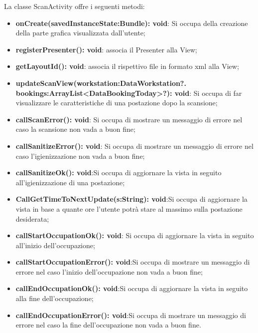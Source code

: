 La classe ScanActivity offre i seguenti metodi:
\begin{itemize}
	\item \textbf{onCreate(savedInstanceState:Bundle): void}: Si occupa della creazione della parte grafica visualizzata dall'utente; 
	\item \textbf{registerPresenter(): void}: associa il Presenter alla View; 
	\item \textbf{getLayoutId(): void}: associa il rispettivo file in formato xml alla View;
	\item \textbf{updateScanView(workstation:DataWorkstation?. bookings:ArrayList<DataBookingToday>?): void}: Si occupa di far visualizzare le caratteristiche di una postazione dopo la scansione; 
	\item \textbf{callScanError(): void}:  Si occupa di mostrare un messaggio di errore nel caso la scansione non vada a buon fine;
	\item \textbf{callSanitizeError(): void}: Si occupa di mostrare un messaggio di errore nel caso l'igienizzazione non vada a buon fine;
	\item \textbf{callSanitizeOk(): void}:Si occupa di aggiornare la vista in seguito all'igienizzazione di una postazione;
	\item \textbf{CallGetTimeToNextUpdate(s:String): void}:Si occupa di aggiornare la vista in base a quante ore l'utente potrà stare al massimo sulla postazione desiderata;
	\item \textbf{callStartOccupationOk(): void}: Si occupa di aggiornare la vista in seguito all'inizio dell'occupazione;
	\item \textbf{callStartOccupationError(): void}:Si occupa di mostrare un messaggio di errore nel caso l'inizio dell'occupazione non vada a buon fine;
	\item \textbf{callEndOccupationOk(): void}:Si occupa di aggiornare la vista in seguito alla fine dell'occupazione;
	\item \textbf{callEndOccupationError(): void}:Si occupa di mostrare un messaggio di errore nel caso la fine dell'occupazione non vada a buon fine.
\end{itemize}


